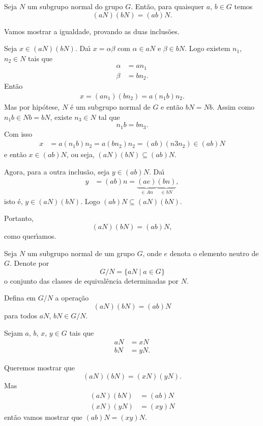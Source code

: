 \begin{proposicao}
    Seja $N$ um subgrupo normal do grupo $G$. Ent\~ao, para quaisquer $a$, $b \in G$ temos
    \[
        (aN)(bN) = (ab)N.
    \]
\end{proposicao}
\begin{prova}
    Vamos mostrar a igualdade, provando as duas inclus\~oes.

    Seja $x \in (aN)(bN)$. Da{\'\i} $x = \alpha\beta$ com $\alpha \in aN$ e $\beta \in bN$. Logo existem $n_1$, $n_2 \in N$ tais que
    \begin{align*}
        \alpha &= an_1\\
        \beta &= bn_2.
    \end{align*}
    Ent\~ao
    \begin{align*}
        x = (an_1)(bn_2) = a(n_1b)n_2.
    \end{align*}
    Mas por hip\'otese, $N$ \'e um subgrupo normal de $G$ e ent\~ao $bN = Nb$. Assim como $n_1b \in Nb = bN$, existe $n_3 \in N$ tal que
    \[
        n_1b = bn_3.
    \]
    Com isso
    \begin{align*}
        x &= a(n_1b)n_2 = a(bn_2)n_2 = (ab)(n3n_2) \in (ab)N
    \end{align*}
    e ent\~ao $x \in (ab)N$, ou seja, $(aN)(bN) \subseteq (ab)N$.

    Agora, para a outra inclus\~ao, seja $y \in (ab)N$. Da{\'\i}
    \begin{align*}
        y &= (ab)n = \underbrace{(ae)}_{\in An}\underbrace{(bn)}_{\in bN},
    \end{align*}
    isto \'e, $y \in (aN)(bN)$. Logo $(ab)N \subseteq (aN)(bN)$.

    Portanto,
    \[
        (aN)(bN) = (ab)N,
    \]
    como quer{\'\i}amos.
\end{prova}

Seja $N$ um subgrupo normal de um grupo $G$, onde $e$ denota o elemento neutro de $G$. Denote por
\[
    G/N = \{aN \mid a \in G\}
\]
o conjunto das classes de equival\^encia determinadas por $N$.

Defina em $G/N$ a opera\c{c}\~ao
\[
    (aN)(bN)  = (ab)N
\]
para todos $aN$, $bN \in G/N$.

Sejam $a$, $b$, $x$, $y \in G$ tais que
\begin{align*}
    aN &= xN\\
    bN &= yN.
\end{align*}

Queremos mostrar que
\[
    (aN)(bN) = (xN)(yN).
\]
Mas
\begin{align*}
    (aN)(bN) &= (ab)N\\
    (xN)(yN) &= (xy)N
\end{align*}
ent\~ao vamos mostrar que $(ab)N = (xy)N$.

